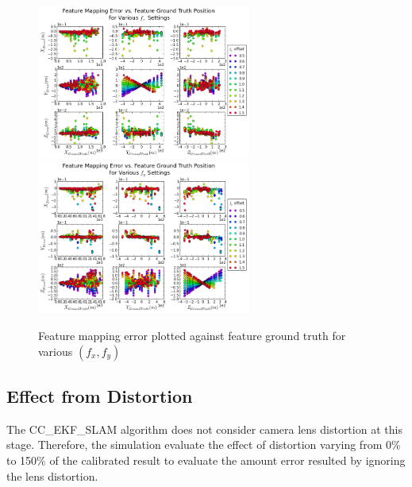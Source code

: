 \begin{figure}[h]
  \centering
  \includegraphics[width=7cm,keepaspectratio=true]{./Figures/SimulationFigures/Figure41.png}
  \includegraphics[width=7cm,keepaspectratio=true]{./Figures/SimulationFigures/Figure42.png}
  \caption{Feature mapping error plotted against feature ground truth
    for various $(f_x, f_y)$}
  \label{fig:simfig38-39}
\end{figure}

\FloatBarrier
\subsection{Effect from Distortion}

The CC\_EKF\_SLAM algorithm does not consider camera lens distortion
at this stage. Therefore, the simulation evaluate the effect of
distortion varying from 0\% to 150\% of the calibrated result to
evaluate the amount error resulted by ignoring the lens distortion. 

